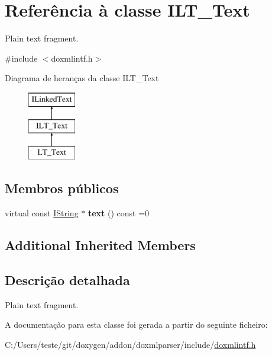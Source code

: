 \hypertarget{class_i_l_t___text}{\section{Referência à classe I\-L\-T\-\_\-\-Text}
\label{class_i_l_t___text}
}


Plain text fragment.  




{\ttfamily \#include $<$doxmlintf.\-h$>$}

Diagrama de heranças da classe I\-L\-T\-\_\-\-Text\begin{figure}[H]
\begin{center}
\leavevmode
\includegraphics[height=3.000000cm]{class_i_l_t___text}
\end{center}
\end{figure}
\subsection*{Membros públicos}
\begin{DoxyCompactItemize}
\item 
\hypertarget{class_i_l_t___text_aa487ae4b2bd6e3e7975ff2efe2666148}{virtual const \hyperlink{class_i_string}{I\-String} $\ast$ {\bfseries text} () const =0}\label{class_i_l_t___text_aa487ae4b2bd6e3e7975ff2efe2666148}

\end{DoxyCompactItemize}
\subsection*{Additional Inherited Members}


\subsection{Descrição detalhada}
Plain text fragment. 

A documentação para esta classe foi gerada a partir do seguinte ficheiro\-:\begin{DoxyCompactItemize}
\item 
C\-:/\-Users/teste/git/doxygen/addon/doxmlparser/include/\hyperlink{include_2doxmlintf_8h}{doxmlintf.\-h}\end{DoxyCompactItemize}
